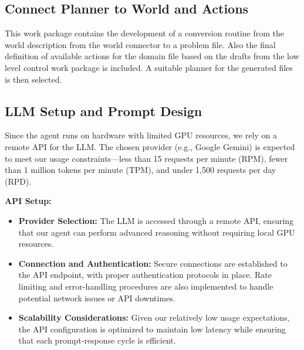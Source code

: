 \documentclass{article}
\begin{document}
\subsection{Connect Planner to World and Actions}

This work package contains the development of a conversion routine from the world description from the world connector to a problem file. Also the final definition of available actions for the domain file based on the drafts from the low level control work package is included. 
A suitable planner for the generated files is then selected.

\subsection{LLM Setup and Prompt Design}

Since the agent runs on hardware with limited GPU resources, we rely on a remote API for the LLM. The chosen provider (e.g., Google Gemini) is expected to meet our usage constraints—less than 15 requests per minute (RPM), fewer than 1 million tokens per minute (TPM), and under 1,500 requests per day (RPD).

\textbf{API Setup:}
\begin{itemize}
    \item \textbf{Provider Selection:}  
    The LLM is accessed through a remote API, ensuring that our agent can perform advanced reasoning without requiring local GPU resources.
    
    \item \textbf{Connection and Authentication:}  
    Secure connections are established to the API endpoint, with proper authentication protocols in place. Rate limiting and error-handling procedures are also implemented to handle potential network issues or API downtimes.
    
    \item \textbf{Scalability Considerations:}  
    Given our relatively low usage expectations, the API configuration is optimized to maintain low latency while ensuring that each prompt-response cycle is efficient.
\end{itemize}
\end{document}
